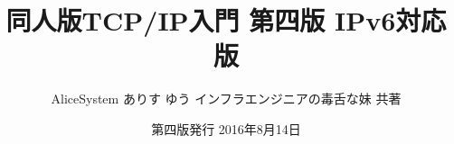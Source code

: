 \title{同人版TCP/IP入門 第四版 IPv6対応版}
\author{AliceSystem ありす ゆう インフラエンジニアの毒舌な妹 共著}
\date{第四版発行 2016年8月14日}